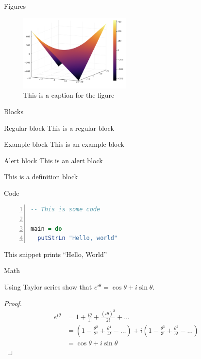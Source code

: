 \documentclass[aspectratio=169, 10pt]{beamer}
\begin{document}
\begin{frame}{Figures}
    \begin{figure}
        \centering
        \includegraphics[width=0.5\textwidth]{
            assets/slides/image-2.png
        }
        \caption{This is a caption for the figure}
        \label{fig:figure-b}
    \end{figure}
\end{frame}

\begin{frame}{Blocks}
  \begin{block}{Regular block}
    This is a regular block
  \end{block}
  
  \begin{exampleblock}{Example block}
    This is an example block
  \end{exampleblock}

  \begin{alertblock}{Alert block}
    This is an alert block
  \end{alertblock}

  \begin{definition}
    This is a definition block
  \end{definition}
\end{frame}

\begin{frame}[fragile]{Code}
\begin{lstlisting}[frame=single,language=Haskell, numbers=left]
-- This is some code

main = do
  putStrLn "Hello, world"
\end{lstlisting}

This snippet prints ``Hello, World''
\end{frame}

\begin{frame}{Math}
    \begin{theorem}
        Using Taylor series show that $e^{i\theta} = \cos\theta + i \sin\theta$.
    \end{theorem}
    \begin{proof}
        \begin{align*}
            e^{i\theta} &= 1 + \frac{i\theta}{1!} + \frac{(i\theta)^2}{2!} + \ldots \\
            &= (1 - \frac{\theta^2}{2!} + \frac{\theta^4}{4!} - \ldots) + i (1 - \frac{\theta^3}{3!} + \frac{\theta^5}{5!} - \ldots) \\
            &= \cos\theta + i \sin\theta
        \end{align*}
    \end{proof}
\end{frame}
\end{document}
